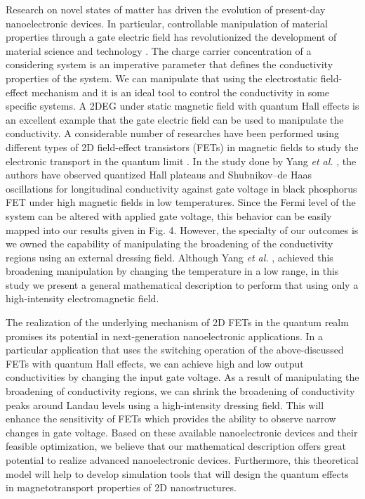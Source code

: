 \documentclass{article}
\begin{document}
{Research on novel states of matter has driven the evolution of present-day nanoelectronic devices. In particular, controllable manipulation of material properties through a gate electric field has revolutionized the development of material science and technology \cite{ahn03,deng18}.
The charge carrier concentration of a considering system is an imperative parameter that defines the conductivity properties of the system. We can manipulate that using the electrostatic field-effect mechanism and it is an ideal tool to control the conductivity in some specific systems.
A 2DEG under static magnetic field with quantum Hall effects is an excellent example that the gate electric field can be used to manipulate the conductivity. A considerable number of researches have been performed using different types of 2D field-effect transistors (FETs) in magnetic fields to study the electronic transport in the quantum limit \cite{wakabayashi78,yang18,long20,li14}. In the study done by Yang \textit{et al.} \cite{yang18}, the authors have observed quantized Hall plateaus and Shubnikov–de Haas oscillations for longitudinal conductivity against gate voltage in black phosphorus FET under high magnetic fields in low temperatures. Since the Fermi level of the system can be altered with applied gate voltage, this behavior can be easily mapped into our results given in Fig. 4. However, the specialty of our outcomes is we owned the capability of manipulating the broadening of the conductivity regions using an external dressing field. Although Yang \textit{et al.} \cite{yang18}, achieved this broadening manipulation by changing the temperature in a low range, in this study we present a general mathematical description to perform that using only a high-intensity electromagnetic field.

The realization of the underlying mechanism of 2D FETs in the quantum realm promises its potential in next-generation nanoelectronic applications. In a particular application that uses the switching operation of the above-discussed FETs with quantum Hall effects, we can achieve high and low output conductivities by changing the input gate voltage. As a result of manipulating the broadening of conductivity regions, we can shrink the broadening of conductivity peaks around Landau levels using a high-intensity dressing field. This will enhance the sensitivity of FETs which provides the ability to observe narrow changes in gate voltage. Based on these available nanoelectronic devices and their feasible optimization, we believe that our mathematical description offers great potential to realize advanced nanoelectronic devices. Furthermore, this theoretical model will help to develop simulation tools that will design the quantum effects in magnetotransport properties of 2D nanostructures.
}
\end{document}
